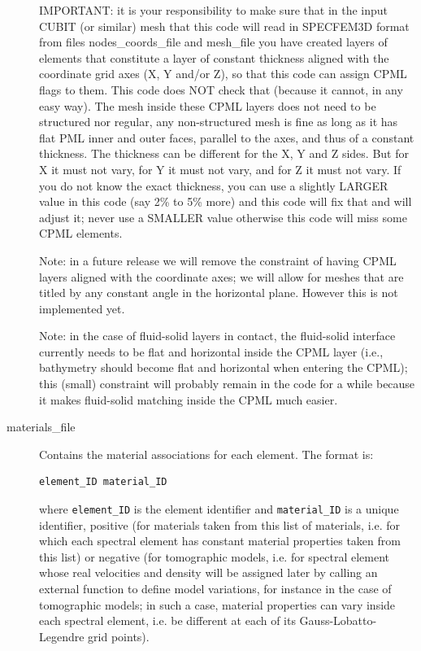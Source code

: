 \begin{description}
IMPORTANT: it is your responsibility to make sure that in the input
CUBIT (or similar) mesh that this code will read in SPECFEM3D format
from files \textquotedbl{}nodes\_coords\_file\textquotedbl{} and \textquotedbl{}mesh\_file\textquotedbl{}
you have created layers of elements that constitute a layer of constant
thickness aligned with the coordinate grid axes (X, Y and/or Z), so
that this code can assign CPML flags to them. This code does NOT check
that (because it cannot, in any easy way). The mesh inside these CPML
layers does not need to be structured nor regular, any non-structured
mesh is fine as long as it has flat PML inner and outer faces, parallel
to the axes, and thus of a constant thickness. The thickness can be
different for the X, Y and Z sides. But for X it must not vary, for
Y it must not vary, and for Z it must not vary. If you do not know
the exact thickness, you can use a slightly LARGER value in this code
(say 2\% to 5\% more) and this code will fix that and will adjust
it; never use a SMALLER value otherwise this code will miss some CPML
elements.


Note: in a future release we will remove the constraint of having
CPML layers aligned with the coordinate axes; we will allow for meshes
that are titled by any constant angle in the horizontal plane. However
this is not implemented yet.


Note: in the case of fluid-solid layers in contact, the fluid-solid
interface currently needs to be flat and horizontal inside the CPML
layer (i.e., bathymetry should become flat and horizontal when entering
the CPML); this (small) constraint will probably remain in the code
for a while because it makes fluid-solid matching inside the CPML
much easier.

\item [{materials\_file}] Contains the material associations for each element.
The format is:
\begin{verbatim}
element_ID material_ID
\end{verbatim}

where \texttt{element\_ID} is the element identifier and \texttt{material\_ID}
is a unique identifier, positive (for materials taken from this list
of materials, i.e. for which each spectral element has constant material
properties taken from this list) or negative (for tomographic models,
i.e. for spectral element whose real velocities and density will be
assigned later by calling an external function to define model variations,
for instance in the case of tomographic models; in such a case, material
properties can vary inside each spectral element, i.e. be different
at each of its Gauss-Lobatto-Legendre grid points).


\end{description}
